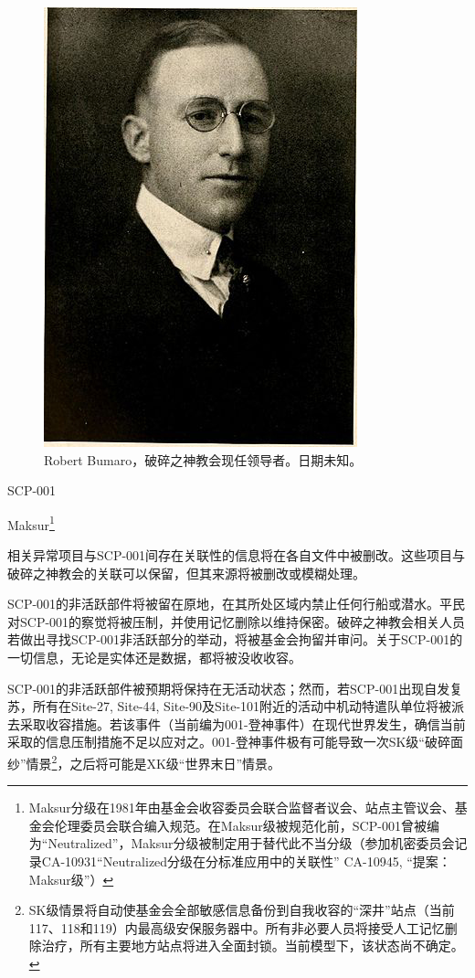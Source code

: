 
\hr

\begin{figure}[H]
	\centering
	\includegraphics[width=0.5\linewidth]{images/SCP-001-the-broken-god-3.jpg}
	\caption*{Robert Bumaro，破碎之神教会现任领导者。日期未知。}
\end{figure}

SCP-001

Maksur\footnote{Maksur分级在1981年由基金会收容委员会联合监督者议会、站点主管议会、基金会伦理委员会联合编入规范。在Maksur级被规范化前，SCP-001曾被编为“Neutralized”，Maksur分级被制定用于替代此不当分级（参加机密委员会记录CA-10931“Neutralized分级在分标准应用中的关联性” CA-10945, “提案：Maksur级”）}

相关异常项目与SCP-001间存在关联性的信息将在各自文件中被删改。这些项目与破碎之神教会的关联可以保留，但其来源将被删改或模糊处理。

SCP-001的非活跃部件将被留在原地，在其所处区域内禁止任何行船或潜水。平民对SCP-001的察觉将被压制，并使用记忆删除以维持保密。破碎之神教会相关人员若做出寻找SCP-001非活跃部分的举动，将被基金会拘留并审问。关于SCP-001的一切信息，无论是实体还是数据，都将被没收收容。

SCP-001的非活跃部件被预期将保持在无活动状态；然而，若SCP-001出现自发复苏，所有在Site-27, Site-44, Site-90及Site-101附近的活动中机动特遣队单位将被派去采取收容措施。若该事件（当前编为001-登神事件）在现代世界发生，确信当前采取的信息压制措施不足以应对之。001-登神事件极有可能导致一次SK级“破碎面纱”情景\footnote{SK级情景将自动使基金会全部敏感信息备份到自我收容的“深井”站点（当前117、118和119）内最高级安保服务器中。所有非必要人员将接受人工记忆删除治疗，所有主要地方站点将进入全面封锁。当前模型下，该状态尚不确定。}，之后将可能是XK级“世界末日”情景。

